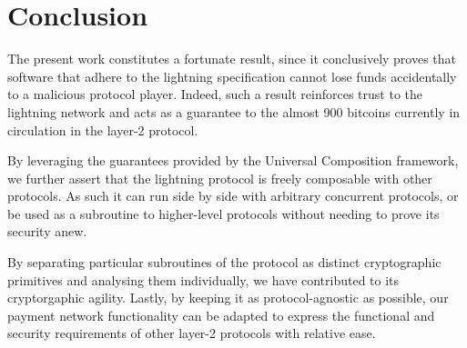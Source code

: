 \section{Conclusion}
  The present work constitutes a fortunate result, since it conclusively proves
  that software that adhere to the lightning specification cannot lose funds
  accidentally to a malicious protocol player. Indeed, such a result reinforces
  trust to the lightning network and acts as a guarantee to the almost 900
  bitcoins currently in circulation in the layer-2 protocol.

  By leveraging the guarantees provided by the Universal Composition framework,
  we further assert that the lightning protocol is freely composable with other
  protocols. As such it can run side by side with arbitrary concurrent
  protocols, or be used as a subroutine to higher-level protocols without
  needing to prove its security anew.

  By separating particular subroutines of the protocol as distinct cryptographic
  primitives and analysing them individually, we have contributed to its
  cryptorgaphic agility. Lastly, by keeping it as protocol-agnostic as possible,
  our payment network functionality can be adapted to express the functional and
  security requirements of other layer-2 protocols with relative ease.
